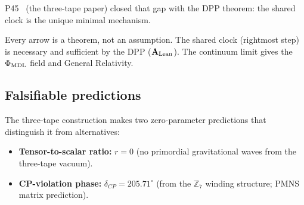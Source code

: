 \documentclass[11pt,a4paper]{article}
\newcommand{\CatAL}{\ensuremath{\mathbf{A}_{\rm Lean}}}
\begin{document}
P45~\cite{SpivackThreeTapeCMCA} (the three-tape paper) closed that gap with the DPP theorem: the
shared clock is the unique minimal mechanism.

\begin{tcolorbox}[colback=boxpurple,colframe=purple!50!black,
  title=The chain of emergence (single 19-bit polynomial $\to$ full physics)]
\begin{center}
\end{center}
\vspace{4pt}
\small Every arrow is a theorem, not an assumption.  The
shared clock (rightmost step) is necessary and sufficient by the DPP (\CatAL).
The continuum limit gives the $\Phi_{\rm MDL}$ field and General Relativity.
\end{tcolorbox}

\subsection{Falsifiable predictions}

The three-tape construction makes two zero-parameter predictions that
distinguish it from alternatives:
\begin{itemize}
  \item \textbf{Tensor-to-scalar ratio:} $r = 0$ (no primordial gravitational
        waves from the three-tape vacuum).
  \item \textbf{CP-violation phase:} $\delta_{CP} = 205.71^\circ$
        (from the $\mathbb{Z}_7$ winding structure; PMNS matrix prediction).
\end{itemize}
\end{document}
